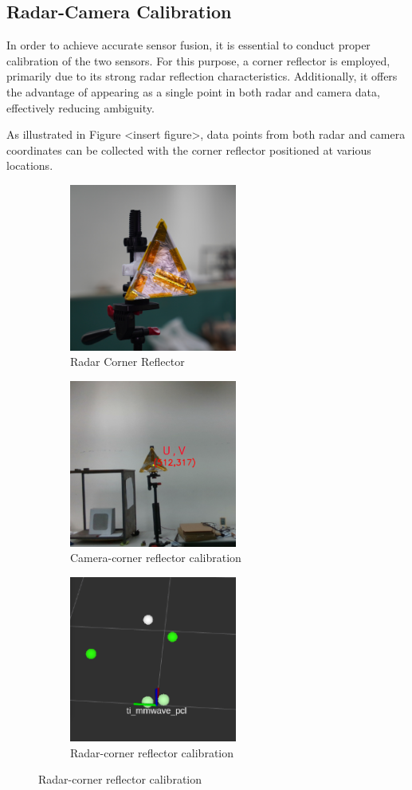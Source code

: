 \subsection{Radar-Camera Calibration}
In order to achieve accurate sensor fusion, it is essential to conduct proper calibration of the two sensors. 
For this purpose, a corner reflector is employed, primarily due to its strong radar reflection characteristics. 
Additionally, it offers the advantage of appearing as a single point in both radar and camera data, effectively reducing ambiguity.

As illustrated in Figure <insert figure>, data points from both radar 
and camera coordinates can be collected with the corner reflector positioned at various locations.
\begin{figure}[hbpt]
    \centering
    \begin{subfigure}{0.25\linewidth}
        \includegraphics[width=5.5cm]{Figures/corner_reflector.jpg}
        \caption{Radar Corner Reflector}
    \end{subfigure}
    \hfill
    \begin{subfigure}{0.25\linewidth}
        \centering
        \includegraphics[width=5.5cm]{Figures/camera_corner.png}
        \caption{Camera-corner reflector calibration}
    \end{subfigure}
    \hfill
    \begin{subfigure}{0.25\linewidth}
        \centering
        \includegraphics[width=5.5cm]{Figures/radar_corner.png}
        \caption{Radar-corner reflector calibration}
    \end{subfigure}


\end{figure}
